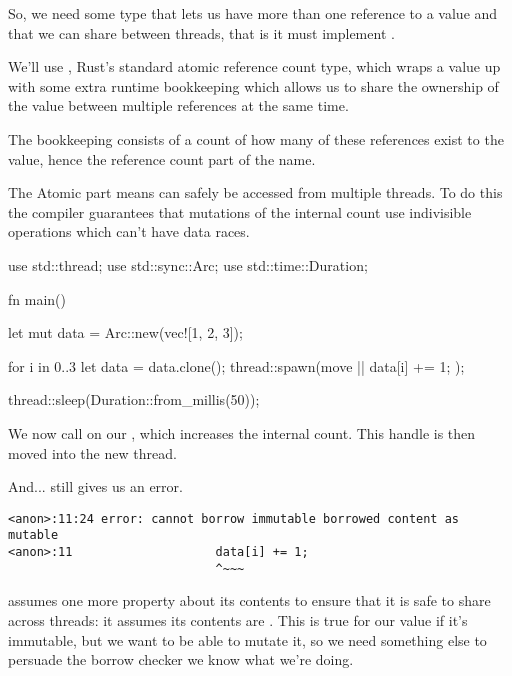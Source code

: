 \blank

So, we need some type that lets us have more than one reference to a value and that we can share between threads, that is it must 
implement .

\blank

We'll use , Rust's standard atomic reference count type, which wraps a value up with some extra runtime bookkeeping 
which allows us to share the ownership of the value between multiple references at the same time.

\blank

The bookkeeping consists of a count of how many of these references exist to the value, hence the reference count part of the name.

\blank

The Atomic part means  can safely be accessed from multiple threads. To do this the compiler guarantees that mutations 
of the internal count use indivisible operations which can't have data races.

\begin{rustc}
use std::thread;
use std::sync::Arc;
use std::time::Duration;

fn main() {
    let mut data = Arc::new(vec![1, 2, 3]);

    for i in 0..3 {
        let data = data.clone();
        thread::spawn(move || {
            data[i] += 1;
        });
    }

    thread::sleep(Duration::from_millis(50));
}
\end{rustc}

We now call  on our , which increases the internal count. This handle is then moved into the new thread.

\blank

And... still gives us an error.

\begin{verbatim}
<anon>:11:24 error: cannot borrow immutable borrowed content as mutable
<anon>:11                    data[i] += 1;
                             ^~~~
\end{verbatim}

 assumes one more property about its contents to ensure that it is safe to share across threads: it assumes its contents 
are . This is true for our value if it's immutable, but we want to be able to mutate it, so we need something else to persuade 
the borrow checker we know what we're doing.

